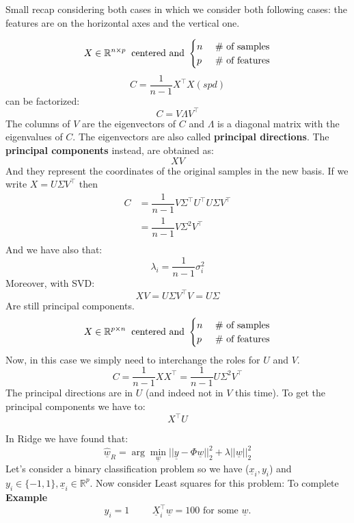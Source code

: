 Small recap considering both cases in which we consider both following cases: the features are on the horizontal axes and the vertical one.
\setlength{\columnseprule}{0.4pt}
\begin{multicols}{2}
    \[
        X \in \mathbb{R}^{n \times p} \hspace{0.2cm} \text{centered and } \begin{cases}
        n & \text{ \# of samples}\\
        p & \text{ \# of features}
    \end{cases}
    \]
    \[
        C = \dfrac{1}{n-1}X^\intercal X (spd)    
    \]
    can be factorized:
    \[
        C = V\Lambda V^\intercal    
    \]
    The columns of $V$ are the eigenvectors of $C$ and $\Lambda$ is a diagonal matrix with the eigenvalues of $C$. The eigenvectors are also called \textbf{principal directions}. The \textbf{principal components} instead, are obtained as:
    \[
        XV    
    \]
    And they represent the coordinates of the original samples in the new basis. If we write $X = U\Sigma V^\intercal$ then
    \[
        \begin{split}
            C &= \dfrac{1}{n-1}V\Sigma^\intercal U^\intercal U\Sigma V^\intercal \\
            &= \dfrac{1}{n-1}V\Sigma^2 V^\intercal \\
        \end{split}    
    \]
    And we have also that:
    \[
        \lambda_i = \dfrac{1}{n-1}\sigma_i^2    
    \]
    Moreover, with SVD:
    \[
        XV = U\Sigma V^\intercal V = U\Sigma    
    \]
    Are still principal components.
    \newcolumn
    \[
        X \in \mathbb{R}^{p \times n} \hspace{0.2cm} \text{centered and } \begin{cases}
        n & \text{ \# of samples}\\
        p & \text{ \# of features}
    \end{cases}
    \]
    Now, in this case we simply need to interchange the roles for $U$ and $V$.
    \[
        C = \dfrac{1}{n-1}XX^\intercal = \dfrac{1}{n-1}U\Sigma^2 V^\intercal
    \]
    The principal directions are in $U$ (and indeed not in $V$ this time). To get the principal components we have to:
    \[
        X^\intercal U    
    \]
\end{multicols}
In Ridge we have found that:
\[
\underline{\hat{w}}_{R} = \arg \min_{\underline{w}} ||\underline{y} - \Phi\underline{w}||_2^2 + \lambda ||\underline{w}||_2^2
\]
Let's consider a binary classification problem so we have ($\underline{x}_i, y_i$) and $y_i \in \{-1, 1\}, \underline{x}_i \in \mathbb{R}^p$. Now consider Least squares for this problem:
\vspace{2cm}    
To complete
\vspace{2cm}
\textbf{Example}
\[
    y_i = 1 \hspace{1cm} \underline{X}_i^\intercal \underline{w} = 100 \text{ for some } \underline{w}.     
\]








